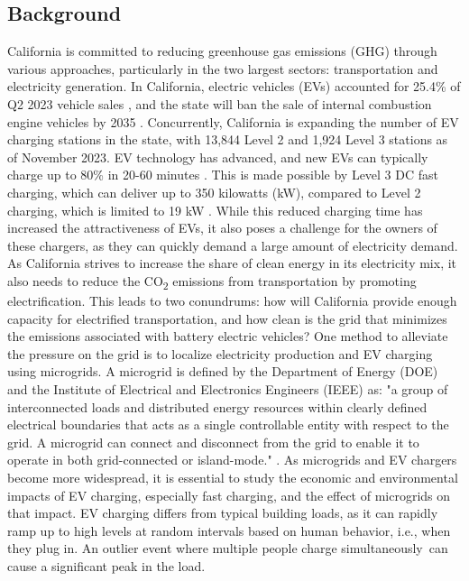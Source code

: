 \documentclass[conference,  usletter]{IEEEtran}
\begin{document}
\subsection{Background}
California is committed to reducing greenhouse gas emissions (GHG) through various approaches, particularly in the two largest sectors: transportation and electricity generation. In California, electric vehicles (EVs) accounted for 25.4\% of Q2 2023 vehicle sales \cite{ev_sale_percentage}, and the state will ban the sale of internal combustion engine vehicles by 2035 \cite{ice_ban}. Concurrently, California is expanding the number of EV charging stations in the state, with 13,844 Level 2 and 1,924 Level 3 stations \cite{ev_stations_CA} as of November 2023. EV technology has advanced, and new EVs can typically charge up to 80\% in 20-60 minutes \cite{ev_stats}. This is made possible by Level 3 DC fast charging, which can deliver up to 350 kilowatts (kW), compared to Level 2 charging, which is limited to 19 kW \cite{ev_stats}. While this reduced charging time has increased the attractiveness of EVs, it also poses a challenge for the owners of these chargers, as they can quickly demand a large amount of electricity demand. As California strives to increase the share of clean energy in its electricity mix, it also needs to reduce the CO\textsubscript{2} emissions from transportation by promoting electrification. This leads to two conundrums: how will California provide enough capacity for electrified transportation, and how clean is the grid that minimizes the emissions associated with battery electric vehicles? One method to alleviate the pressure on the grid is to localize electricity production and EV charging using microgrids. A microgrid is defined by the Department of Energy (DOE) and the Institute of Electrical and Electronics Engineers (IEEE) as: "a group of interconnected loads and distributed energy resources within clearly defined electrical boundaries that acts as a single controllable entity with respect to the grid. A microgrid can connect and disconnect from the grid to enable it to operate in both grid-connected or island-mode." \cite{microgrid_def} \cite{microgrid_def_ieee}. As microgrids and EV chargers become more widespread, it is essential to study the economic and environmental impacts of EV charging, especially fast charging, and the effect of microgrids on that impact. EV charging differs from typical building loads, as it can rapidly ramp up to high levels at random intervals based on human behavior, i.e., when they plug in. An outlier event where multiple people charge simultaneously can cause a significant peak in the load. 
\end{document}
